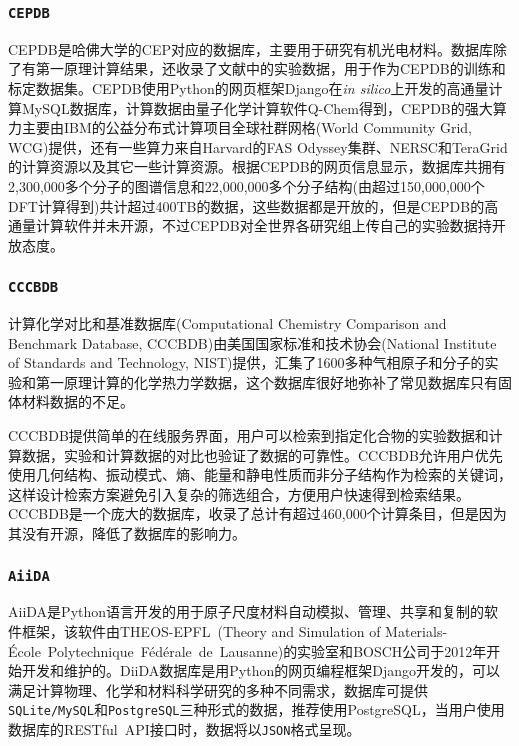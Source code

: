 \subsubsection{\tt{CEPDB}}
\textrm{CEPDB}是哈佛大学的\textrm{CEP}对应的数据库，主要用于研究有机光电材料\cite{CEPDB_URL,JPCL2-2241_2011}。数据库除了有第一原理计算结果，还收录了文献中的实验数据，用于作为\textrm{CEPDB}的训练和标定数据集。\textrm{CEPDB}使用\textrm{Python}的网页框架\textrm{Django}在\textit{in silico}上开发的高通量计算\textrm{MySQL}数据库，计算数据由量子化学计算软件\textrm{Q-Chem}得到，\textrm{CEPDB}的强大算力主要由\textrm{IBM}的公益分布式计算项目全球社群网格\textrm{(World Community Grid, WCG)}提供，还有一些算力来自\textrm{Harvard}的\textrm{FAS Odyssey}集群、\textrm{NERSC}和\textrm{TeraGrid}的计算资源以及其它一些计算资源。根据\textrm{CEPDB}的网页信息显示，数据库共拥有2,300,000多个分子的图谱信息和22,000,000多个分子结构(由超过150,000,000个\textrm{DFT}计算得到)共计超过400\textrm{TB}的数据，这些数据都是开放的，但是\textrm{CEPDB}的高通量计算软件并未开源，不过\textrm{CEPDB}对全世界各研究组上传自己的实验数据持开放态度。

\subsubsection{\texttt{CCCBDB}}
计算化学对比和基准数据库\textrm{(Computational Chemistry Comparison and Benchmark Database, CCCBDB)}由美国国家标准和技术协会(\textrm{National Institute of Standards and Technology, NIST})提供，汇集了1600多种气相原子和分子的实验和第一原理计算的化学热力学数据\cite{CCCBDB}，这个数据库很好地弥补了常见数据库只有固体材料数据的不足。

\textrm{CCCBDB}提供简单的在线服务界面，用户可以检索到指定化合物的实验数据和计算数据，实验和计算数据的对比也验证了数据的可靠性。\textrm{CCCBDB}允许用户优先使用几何结构、振动模式、熵、能量和静电性质而非分子结构作为检索的关键词，这样设计检索方案避免引入复杂的筛选组合，方便用户快速得到检索结果。\textrm{CCCBDB}是一个庞大的数据库，收录了总计有超过460,000个计算条目，但是因为其没有开源，降低了数据库的影响力。

\subsubsection{\tt{AiiDA}}
\textrm{AiiDA}\cite{AiiDA_URL}是\textrm{Python}语言开发的用于原子尺度材料自动模拟、管理、共享和复制的软件框架，该软件由\textrm{THEOS-EPFL~(Theory and Simulation of Materials-{\'E}cole~Polytechnique~F{\'e}d{\'e}rale~de~Lausanne)}的实验室和\textrm{BOSCH}公司于2012年开始开发和维护的。\textrm{DiiDA}数据库是用\textrm{Python}的网页编程框架\textrm{Django}开发的\cite{CMS187-110086_2021}，可以满足计算物理、化学和材料科学研究的多种不同需求，数据库可提供\texttt{SQLite/MySQL}和\texttt{PostgreSQL}三种形式的数据，推荐使用\textrm{PostgreSQL}，当用户使用数据库的\textrm{RESTful~API}接口时，数据将以\texttt{JSON}格式呈现。

